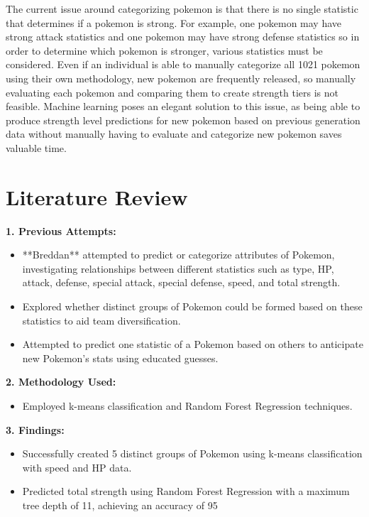 \documentclass[conference]{IEEEtran}
\begin{document}
\noindent The current issue around categorizing pokemon is that there is no single statistic that determines if a pokemon is strong. For example, one pokemon may have strong attack statistics and one pokemon may have strong defense statistics so in order to determine which pokemon is stronger, various statistics must be considered. Even if an individual is able to manually categorize all 1021 pokemon using their own methodology, new pokemon are frequently released, so manually evaluating each pokemon and comparing them to create strength tiers is not feasible. Machine learning poses an elegant solution to this issue, as being able to produce strength level predictions for new pokemon based on previous generation data without manually having to evaluate and categorize new pokemon saves valuable time.

\chapter{Literature Review}
\begin{center}
\textbf{1. Previous Attempts:}
\end{center}
\begin{itemize}
                \item **Breddan** attempted to predict or categorize attributes of Pokemon, investigating relationships between different statistics such as type, HP, attack, defense, special attack, special defense, speed, and total strength.
                \item Explored whether distinct groups of Pokemon could be formed based on these statistics to aid team diversification.
                \item Attempted to predict one statistic of a Pokemon based on others to anticipate new Pokemon's stats using educated guesses.
            \end{itemize}
            
\begin{center}
\textbf{2. Methodology Used:}
\end{center}
\begin{itemize}
                \item Employed k-means classification and Random Forest Regression techniques.
            \end{itemize}
            
\begin{center}
\textbf{3. Findings:}
\end{center}          
            \begin{itemize}
                \item Successfully created 5 distinct groups of Pokemon using k-means classification with speed and HP data.
                \item Predicted total strength using Random Forest Regression with a maximum tree depth of 11, achieving an accuracy of 95%
            \end{itemize}
            
\end{document}
